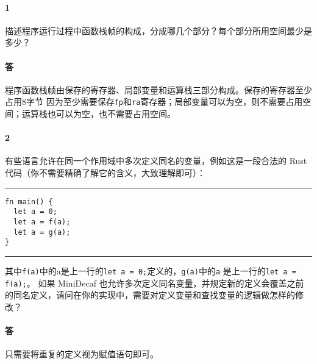 \documentclass[UTF8]{ctexart}
\newcommand{\T}[1]{\texttt{{#1}}}
\begin{document}
        \paragraph{1} 描述程序运行过程中函数栈帧的构成，分成哪几个部分？每个部分所用空间最少是多少？
        \paragraph{答} 程序函数栈帧由保存的寄存器、局部变量和运算栈三部分构成。保存的寄存器至少占用8字节
        因为至少需要保存\T{fp}和\T{ra}寄存器；局部变量可以为空，则不需要占用空间；运算栈也可以为空，也不需要占用空间。
        \paragraph{2} 有些语言允许在同一个作用域中多次定义同名的变量，例如这是一段合法的 Rust 代码（你不需要精确了解它的含义，大致理解即可）：
        
        \noindent\rule{\textwidth}{1pt}
        \begin{lstlisting}[style=lfonts]
fn main() {
  let a = 0;
  let a = f(a);
  let a = g(a);
}
        \end{lstlisting}
        \noindent\rule{\textwidth}{1pt}
        
        其中\T{f(a)}中的a是上一行的\T{let a = 0;}定义的，\T{g(a)}中的\T{a}
        是上一行的\T{let a = f(a);}。
        如果 MiniDecaf 也允许多次定义同名变量，并规定新的定义会覆盖之前的同名定义，请问在你的实现中，需要对定义变量和查找变量的逻辑做怎样的修改？
        \paragraph{答} 只需要将重复的定义视为赋值语句即可。
\end{document}
